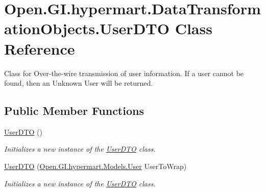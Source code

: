 \hypertarget{class_open_1_1_g_i_1_1hypermart_1_1_data_transformation_objects_1_1_user_d_t_o}{}\section{Open.\+G\+I.\+hypermart.\+Data\+Transformation\+Objects.\+User\+D\+TO Class Reference}
\label{class_open_1_1_g_i_1_1hypermart_1_1_data_transformation_objects_1_1_user_d_t_o}


Class for Over-\/the-\/wire transmission of user information. If a user cannot be found, then an Unknown User will be returned.  


\subsection*{Public Member Functions}
\begin{DoxyCompactItemize}
\item 
\hyperlink{class_open_1_1_g_i_1_1hypermart_1_1_data_transformation_objects_1_1_user_d_t_o_ab715e6cac8b432f39c5fe6f22e3db645}{User\+D\+TO} ()
\begin{DoxyCompactList}\small\item\em Initializes a new instance of the \hyperlink{class_open_1_1_g_i_1_1hypermart_1_1_data_transformation_objects_1_1_user_d_t_o}{User\+D\+TO} class. \end{DoxyCompactList}\item 
\hyperlink{class_open_1_1_g_i_1_1hypermart_1_1_data_transformation_objects_1_1_user_d_t_o_a21ce2f8eaac0781bcc484f8eeca38404}{User\+D\+TO} (\hyperlink{class_open_1_1_g_i_1_1hypermart_1_1_models_1_1_user}{Open.\+G\+I.\+hypermart.\+Models.\+User} User\+To\+Wrap)
\begin{DoxyCompactList}\small\item\em Initializes a new instance of the \hyperlink{class_open_1_1_g_i_1_1hypermart_1_1_data_transformation_objects_1_1_user_d_t_o}{User\+D\+TO} class. \end{DoxyCompactList}\end{DoxyCompactItemize}
